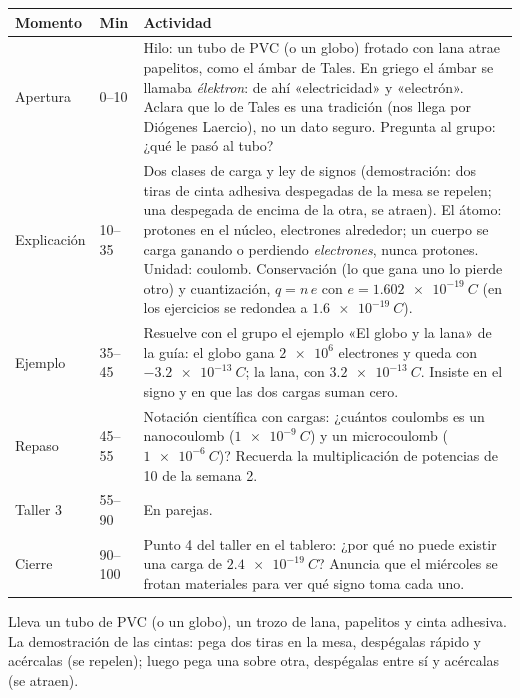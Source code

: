 \documentclass[11pt]{article}
\begin{document}
\begin{center}
{\renewcommand{\arraystretch}{1.3}
\begin{tabularx}{\linewidth}{@{}l l X@{}}
  \toprule
  \textbf{Momento} & \textbf{Min} & \textbf{Actividad}\\
  \midrule
  Apertura & 0–10 & Hilo: un tubo de PVC (o un globo) frotado con lana atrae papelitos, como
    el ámbar de Tales. En griego el ámbar se llamaba \emph{élektron}: de ahí «electricidad» y
    «electrón». Aclara que lo de Tales es una tradición (nos llega por Diógenes Laercio), no un
    dato seguro. Pregunta al grupo: ¿qué le pasó al tubo?\\
  Explicación & 10–35 & Dos clases de carga y ley de signos (demostración: dos tiras de cinta
    adhesiva despegadas de la mesa se repelen; una despegada de encima de la otra, se atraen).
    El átomo: protones en el núcleo, electrones alrededor; un cuerpo se carga ganando o
    perdiendo \emph{electrones}, nunca protones. Unidad: coulomb. Conservación (lo que gana uno
    lo pierde otro) y cuantización, $q = n\,e$ con $e = \qty{1,602e-19}{C}$ (en los
    ejercicios se redondea a $\qty{1,6e-19}{C}$).\\
  Ejemplo & 35–45 & Resuelve con el grupo el ejemplo «El globo y la lana» de la guía: el
    globo gana $\num{2e6}$ electrones y queda con $\qty{-3,2e-13}{C}$; la lana, con
    $\qty{+3,2e-13}{C}$. Insiste en el signo y en que las dos cargas suman cero.\\
  Repaso & 45–55 & Notación científica con cargas: ¿cuántos coulombs es un
    nanocoulomb ($\qty{1e-9}{C}$) y un microcoulomb ($\qty{1e-6}{C}$)? Recuerda la
    multiplicación de potencias de 10 de la semana 2.\\
  Taller 3 & 55–90 & En parejas.\\
  Cierre & 90–100 & Punto 4 del taller en el tablero: ¿por qué no puede existir una carga de
    $\qty{2,4e-19}{C}$? Anuncia que el miércoles se frotan materiales para ver qué signo toma
    cada uno.\\
  \bottomrule
\end{tabularx}}
\end{center}

\begin{nota}
Lleva un tubo de PVC (o un globo), un trozo de lana, papelitos y cinta adhesiva. La
demostración de las cintas: pega dos tiras en la mesa, despégalas rápido y acércalas (se
repelen); luego pega una sobre otra, despégalas entre sí y acércalas (se atraen).
\end{nota}
\end{document}
